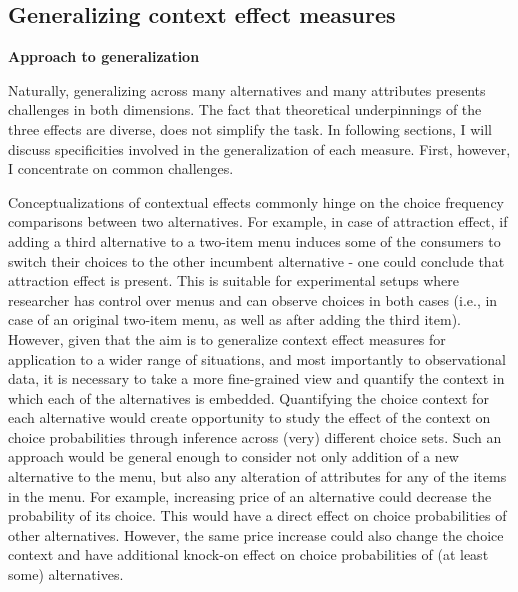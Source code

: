 \documentclass[a4paper,12pt]{article}
\begin{document}
\subsection{Generalizing context effect measures}
\textbf{Approach to generalization}

Naturally, generalizing across many alternatives and many attributes presents challenges in both dimensions. The fact that theoretical underpinnings of the three effects are diverse, does not simplify the task. In following sections, I will discuss specificities involved in the generalization of each measure. First, however, I concentrate on common challenges.

Conceptualizations of contextual effects commonly hinge on the choice frequency comparisons between two alternatives. For example, in case of attraction effect, if adding a third alternative to a two-item menu induces some of the consumers to switch their choices to the other incumbent alternative - one could conclude that attraction effect is present. This is suitable for experimental setups where researcher has control over menus and can observe choices in both cases (i.e., in case of an original two-item menu, as well as after adding the third item). However, given that the aim is to generalize context effect measures for application to a wider range of situations, and most importantly to observational data, it is necessary to take a more fine-grained view and quantify the context in which each of the alternatives is embedded. Quantifying the choice context for each alternative would create opportunity to study the effect of the context on choice probabilities through inference across (very) different choice sets. Such an approach would be general enough to consider not only addition of a new alternative to the menu, but also any alteration of attributes for any of the items in the menu. For example, increasing price of an alternative could decrease the probability of its choice. This would have a direct effect on choice probabilities of other alternatives. However, the same price increase could also change the choice context and have additional knock-on effect on choice probabilities of (at least some) alternatives.
\end{document}
